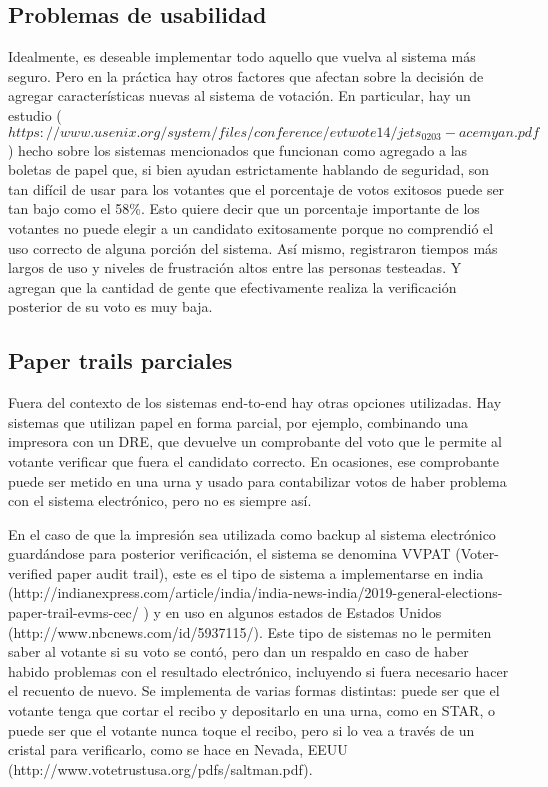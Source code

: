 \subsection{Problemas de usabilidad}

Idealmente, es deseable implementar todo aquello que vuelva al sistema más seguro. Pero en la práctica hay otros factores que afectan sobre la decisión de agregar características nuevas al sistema de votación. En particular, hay un estudio ($https://www.usenix.org/system/files/conference/evtwote14/jets_0203-acemyan.pdf$ ) hecho sobre los sistemas mencionados que funcionan como agregado a las boletas de papel que, si bien ayudan estrictamente hablando de seguridad, son tan difícil de usar para los votantes que el porcentaje de votos exitosos puede ser tan bajo como el 58\%. Esto quiere decir que un porcentaje importante de los votantes no puede elegir a un candidato exitosamente porque no comprendió el uso correcto de alguna porción del sistema. Así mismo, registraron tiempos más largos de uso y niveles de frustración altos entre las personas testeadas. Y agregan que la cantidad de gente que efectivamente realiza la verificación posterior de su voto es muy baja.

\subsection{Paper trails parciales}

Fuera del contexto de los sistemas end-to-end hay otras opciones utilizadas. Hay sistemas que utilizan papel en forma parcial, por ejemplo, combinando una impresora con un DRE, que devuelve un comprobante del voto que le permite al votante verificar que fuera el candidato correcto. En ocasiones, ese comprobante puede ser metido en una urna y usado para contabilizar votos de haber problema con el sistema electrónico, pero no es siempre así.

En el caso de que la impresión sea utilizada como backup al sistema electrónico guardándose para posterior verificación, el sistema se denomina VVPAT (Voter-verified paper audit trail), este es el tipo de sistema a implementarse en india (http://indianexpress.com/article/india/india-news-india/2019-general-elections-paper-trail-evms-cec/ ) y en uso en algunos estados de Estados Unidos (http://www.nbcnews.com/id/5937115/). Este tipo de sistemas no le permiten saber al votante si su voto se contó, pero dan un respaldo en caso de haber habido problemas con el resultado electrónico, incluyendo si fuera necesario hacer el recuento de nuevo.
Se implementa de varias formas distintas: puede ser que el votante tenga que cortar el recibo y depositarlo en una urna, como en STAR, o puede ser que el votante nunca toque el recibo, pero si lo vea a través de un cristal para verificarlo, como se hace en Nevada, EEUU (http://www.votetrustusa.org/pdfs/saltman.pdf).

